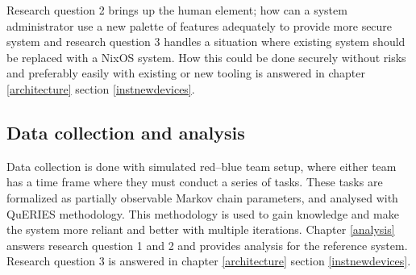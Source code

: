 Research question 2 brings up the human element; how can a system
administrator use a new palette of features adequately to provide more
secure system and research question 3 handles a situation where
existing system should be replaced with a NixOS system. How this
could be done securely without risks and preferably easily with
existing or new tooling is answered in chapter \ref{architecture}
section \ref{instnewdevices}.

\subsection{Data collection and analysis}

Data collection is done with simulated red–blue team setup, where
either team has a time frame where they must conduct a series of
tasks. These tasks are formalized as partially observable Markov chain
parameters, and analysed with QuERIES methodology. This methodology is
used to gain knowledge and make the system more reliant and better
with multiple iterations. Chapter \ref{analysis} answers research
question 1 and 2 and provides analysis for the reference
system. Research question 3 is answered in chapter \ref{architecture}
section \ref{instnewdevices}.
